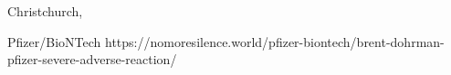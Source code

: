           {
            Christchurch,
          }
          {
            
          }
          {
            Pfizer/BioNTech
          }
          {
          }
          {
          }
          {
            https://nomoresilence.world/pfizer-biontech/brent-dohrman-pfizer-severe-adverse-reaction/
          }

